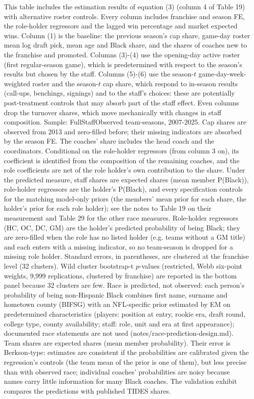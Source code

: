 \begin{table}[!h]
{\begin{threeparttable}
\begin{tablenotes}[para]
\item This table includes the estimation results of equation (3) (column 4 of Table 19) with alternative roster controls. Every column includes franchise and season FE, the role-holder regressors and the lagged win percentage and market expected wins. Column (1) is the baseline: the previous season's cap share, game-day roster mean log draft pick, mean age and Black share, and the shares of coaches new to the franchise and promoted. Columns (3)-(4) use the opening-day active roster (first regular-season game), which is predetermined with respect to the season's results but chosen by the staff. Columns (5)-(6) use the season-$t$ game-day-week-weighted roster and the season-$t$ cap share, which respond to in-season results (call-ups, benchings, signings) and to the staff's choices: these are potentially post-treatment controls that may absorb part of the staff effect. Even columns drop the turnover shares, which move mechanically with changes in staff composition. Sample: FullStaffObserved team-seasons, 2007-2025. Cap shares are observed from 2013 and zero-filled before; their missing indicators are absorbed by the season FE. The coaches' share includes the head coach and the coordinators. Conditional on the role-holder regressors (from column 3 on), its coefficient is identified from the composition of the remaining coaches, and the role coefficients are net of the role holder's own contribution to the share. Under the predicted measure, staff shares are expected shares (mean member P(Black)), role-holder regressors are the holder's P(Black), and every specification controls for the matching model-only priors (the members' mean prior for each share, the holder's prior for each role holder); see the notes to Table 19 on their measurement and Table 29 for the other race measures. Role-holder regressors (HC, OC, DC, GM) are the holder's predicted probability of being Black; they are zero-filled when the role has no listed holder (e.g. teams without a GM title) and each enters with a missing indicator, so no team-season is dropped for a missing role holder. Standard errors, in parentheses, are clustered at the franchise level (32 clusters). Wild cluster bootstrap-t $p$-values (restricted, Webb six-point weights, 9,999 replications, clustered by franchise) are reported in the bottom panel because 32 clusters are few. Race is predicted, not observed: each person's probability of being non-Hispanic Black combines first name, surname and hometown county (BIFSG) with an NFL-specific prior estimated by EM on predetermined characteristics (players: position at entry, rookie era, draft round, college type, county availability; staff: role, unit and era at first appearance); documented race statements are not used (notes/race-prediction-design.md). Team shares are expected shares (mean member probability). Their error is Berkson-type: estimates are consistent if the probabilities are calibrated given the regression's controls (the team mean of the prior is one of them), but less precise than with observed race; individual coaches' probabilities are noisy because names carry little information for many Black coaches. The validation exhibit compares the predictions with published TIDES shares.

\end{tablenotes}
\end{threeparttable}}
\end{table}
